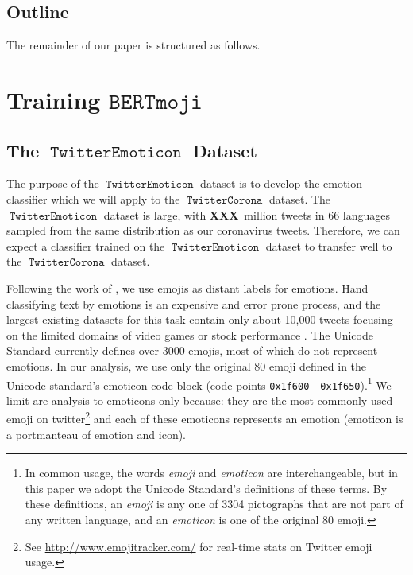 \documentclass[11pt]{article}
\newcommand{\defn}[1]{\emph{{#1}}}
\newcommand{\XXX}{\textbf{XXX}~}
\newcommand{\bertmoji}{\texttt{BERTmoji}}
\DeclareMathOperator{\emoticon}{\texttt{TwitterEmoticon}}
\DeclareMathOperator{\corona}{\texttt{TwitterCorona}}
\begin{document}
\subsection{Outline}

The remainder of our paper is structured as follows.


\section{Training $\bertmoji$}


\subsection{The $\emoticon$ Dataset}

The purpose of the $\emoticon$ dataset is to develop the emotion classifier which we will apply to the $\corona$ dataset.
The $\emoticon$ dataset is large, with \XXX million tweets in 66 languages sampled from the same distribution as our coronavirus tweets.
Therefore, we can expect a classifier trained on the $\emoticon$ dataset to transfer well to the $\corona$ dataset.

Following the work of \citet{fixme1,fixme2,fixme3}, we use emojis as distant labels for emotions.
Hand classifying text by emotions is an expensive and error prone process,
and the largest existing datasets for this task contain only about 10,000 tweets focusing on the limited domains of video games \citep{fixme} or stock performance \citep{fixme}.
The Unicode Standard \citep{fixme} currently defines over 3000 emojis,
most of which do not represent emotions.
In our analysis, we use only the original 80 emoji defined in the Unicode standard's emoticon code block (code points \texttt{0x1f600} - \texttt{0x1f650}).\footnote{
    In common usage, the words \defn{emoji} and \defn{emoticon} are interchangeable,
    but in this paper we adopt the Unicode Standard's definitions of these terms.
    By these definitions, an \defn{emoji} is any one of 3304 pictographs that are not part of any written language,
    and an \defn{emoticon} is one of the original 80 emoji.
}
We limit are analysis to emoticons only because:
they are the most commonly used emoji on twitter\footnote{
    See \url{http://www.emojitracker.com/} for real-time stats on Twitter emoji usage.
}
and each of these emoticons represents an emotion (emoticon is a portmanteau of emotion and icon).
\end{document}
